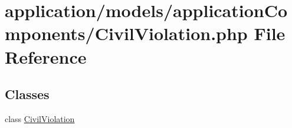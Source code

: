 \hypertarget{_civil_violation_8php}{\section{application/models/application\-Components/\-Civil\-Violation.php File Reference}
\label{_civil_violation_8php}
}
\subsection*{Classes}
\begin{DoxyCompactItemize}
\item 
class \hyperlink{class_civil_violation}{Civil\-Violation}
\end{DoxyCompactItemize}
